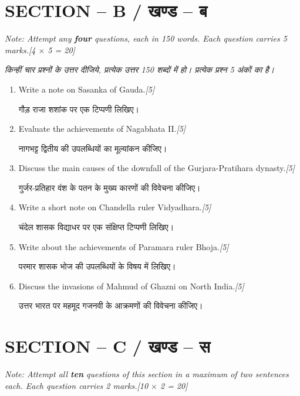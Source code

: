 \documentclass[11pt,a4paper]{article}
\newcommand{\pts}[1]{\hfill \textit{[#1]}}
\begin{document}
\bigskip

\section*{SECTION -- B / खण्ड -- ब}
\noindent \textit{Note: Attempt any \textbf{four} questions, each in 150 words. Each question carries 5 marks.}\pts{4 $\times$ 5 = 20}

\noindent \textit{किन्हीं चार प्रश्नों के उत्तर दीजिये, प्रत्येक उत्तर 150 शब्दों में हो। प्रत्येक प्रश्न 5 अंकों का है।}

\begin{enumerate}[label=\textbf{\arabic*.},leftmargin=*,start=6,itemsep=10pt]

  \item Write a note on Sasanka of Gauda.\pts{5}
  
  गौड़ राजा शशांक पर एक टिप्पणी लिखिए।

  \item Evaluate the achievements of Nagabhata II.\pts{5}
  
  नागभट्ट द्वितीय की उपलब्धियों का मूल्यांकन कीजिए।

  \item Discuss the main causes of the downfall of the Gurjara-Pratihara dynasty.\pts{5}
  
  गुर्जर-प्रतिहार वंश के पतन के मुख्य कारणों की विवेचना कीजिए।

  \item Write a short note on Chandella ruler Vidyadhara.\pts{5}
  
  चंदेल शासक विद्याधर पर एक संक्षिप्त टिप्पणी लिखिए।

  \item Write about the achievements of Paramara ruler Bhoja.\pts{5}
  
  परमार शासक भोज की उपलब्धियों के विषय में लिखिए।

  \item Discuss the invasions of Mahmud of Ghazni on North India.\pts{5}
  
  उत्तर भारत पर महमूद गजनवी के आक्रमणों की विवेचना कीजिए।

\end{enumerate}

\bigskip

\section*{SECTION -- C / खण्ड -- स}
\noindent \textit{Note: Attempt all \textbf{ten} questions of this section in a maximum of two sentences each. Each question carries 2 marks.}\pts{10 $\times$ 2 = 20}
\end{document}
